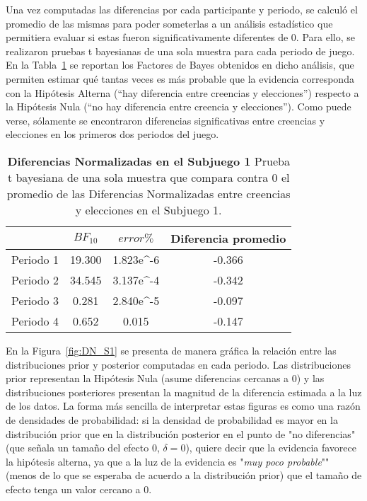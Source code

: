 Una vez computadas las diferencias por cada participante y periodo, se calculó el promedio de las mismas para poder someterlas a un análisis estadístico que permitiera evaluar si estas fueron significativamente diferentes de 0. Para ello, se realizaron pruebas t bayesianas de una sola muestra para cada periodo de juego. En la Tabla~\ref{DN-S1-B} se reportan los Factores de Bayes obtenidos en dicho análisis, que permiten estimar qué tantas veces es más probable que la evidencia corresponda con la Hipótesis Alterna (``hay diferencia entre creencias y elecciones'') respecto a la Hipótesis Nula (``no hay diferencia entre creencia y elecciones''). Como puede verse, sólamente se encontraron diferencias significativas entre creencias y elecciones en los primeros dos periodos del juego.\\

\begin{table}[h]
\caption[Diferencias Normalizadas en el Subjuego 1 (prueba t de una muestra)]{\textbf{Diferencias Normalizadas en el Subjuego 1} Prueba t bayesiana de una sola muestra que compara contra 0 el promedio de las Diferencias Normalizadas entre creencias y elecciones en el Subjuego 1.}
\label{DN-S1-B}
\centering
\begin{tabular}{l | c c | c}
\toprule
\textbf{} & \textbf{$BF_{10}$} & \textbf{$error\%$} & \textbf{Diferencia promedio}\\
\midrule
Periodo 1 & 19.300 & 1.823e^-6 & -0.366\\
Periodo 2 & 34.545 & 3.137e^-4 & -0.342\\
Periodo 3 & 0.281 & 2.840e^-5 & -0.097\\
Periodo 4 & 0.652 & 0.015 & -0.147\\
\bottomrule
\end{tabular}
\end{table}

En la Figura~\ref{fig:DN_S1} se presenta de manera gráfica la relación entre las distribuciones prior y posterior computadas en cada periodo. Las distribuciones prior representan la Hipótesis Nula (asume diferencias  cercanas a 0) y las distribuciones posteriores presentan la magnitud de la diferencia estimada a la luz de los datos. La forma más sencilla de interpretar estas figuras es como una razón de densidades de probabilidad: si la densidad de probabilidad es mayor en la distribución prior que en la distribución posterior en el punto de "no diferencias" (que señala un tamaño del efecto 0, $\delta = 0$), quiere decir que la evidencia favorece la hipótesis alterna, ya que a la luz de la evidencia es "\textit{muy poco probable}"" (menos de lo que se esperaba de acuerdo a la distribución prior) que el tamaño de efecto tenga un valor cercano a 0.\\
  
